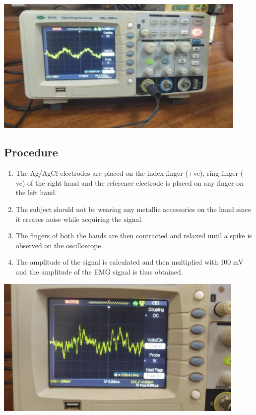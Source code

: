 \documentclass[
  11pt,
  letterpaper,
  DIV=11,
  numbers=noendperiod]{scrreprt}
\providecommand{\tightlist}{%
  \setlength{\itemsep}{0pt}\setlength{\parskip}{0pt}}\usepackage{longtable,booktabs,array}
\begin{document}
\begin{center}
\includegraphics[width=4.8125in,height=\textheight]{images/clipboard-2396942276.png}
\end{center}

\subsection{Procedure}\label{procedure-2}

\begin{enumerate}
\def\labelenumi{\arabic{enumi}.}
\tightlist
\item
  The Ag/AgCl electrodes are placed on the index finger (+ve), ring
  finger (-ve) of the right hand and the reference electrode is placed
  on any finger on the left hand.
\item
  The subject should not be wearing any metallic accessories on the hand
  since it creates noise while acquiring the signal.
\item
  The fingers of both the hands are then contracted and relaxed until a
  spike is observed on the oscilloscope.
\item
  The amplitude of the signal is calculated and then multiplied with 100
  mV and the amplitude of the EMG signal is thus obtained.
\end{enumerate}

\begin{center}
\includegraphics[width=4.77083in,height=\textheight]{images/clipboard-1109147105.png}
\end{center}
\end{document}
